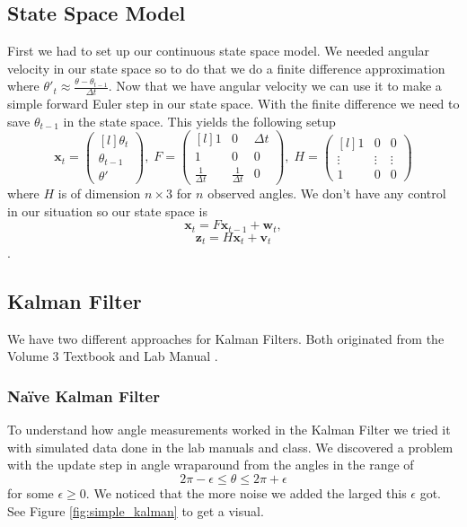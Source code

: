 \documentclass[11pt]{amsart}
\begin{document}
\subsection{State Space Model}
First we had to set up our continuous state space model. We needed angular velocity in our state space so to do that we do a finite difference approximation 
where $\theta'_t \approx \frac{\theta - \theta_{t-1}}{\Delta t}$. Now that we have angular velocity we can use it to make a simple forward Euler step in our state 
space. With the finite difference we need to save $\theta_{t-1}$ in the state space. This yields the following setup
\[\mathbf{x}_t = \begin{pmatrix*}[l]
    \theta_t \\
    \theta_{t-1} \\
    \theta'
\end{pmatrix*},\;  
F = \begin{pmatrix*}[l]
    1 & 0 & \Delta t \\
    1 & 0 & 0 \\
    \frac{1}{\Delta t} & \frac{1}{\Delta t} & 0
\end{pmatrix*},\;
H = \begin{pmatrix*}[l]
    1 & 0 & 0 \\
    \vdots & \vdots & \vdots\\
    1 & 0 & 0

\end{pmatrix*}\]
 where $H$ is of dimension $n\times3$ for $n$ observed angles. We don't have any control in our situation so our state space is
 \[\mathbf{x}_t = F\mathbf{x}_{t-1} + \mathbf{w}_t,\]
\[\mathbf{z}_t = H\mathbf{x}_t + \mathbf{v}_t\].

\subsection{Kalman Filter}
We have two different approaches for Kalman Filters. Both originated from the Volume 3 Textbook \cite{V3} and Lab Manual \cite{V3 Lab Manual}.
\subsubsection{Naïve Kalman Filter}
To understand how angle measurements worked in the Kalman Filter we tried it with
simulated data done in the lab manuals and class. We discovered a problem with the update step in angle wraparound from the angles in the range of 
\[2\pi - \epsilon \leq \theta \leq 2\pi + \epsilon\] for some $\epsilon \geq 0$. We noticed that the more noise we added the larged this $\epsilon$ got. 
See Figure \ref{fig:simple_kalman} to get a visual.
\end{document}
